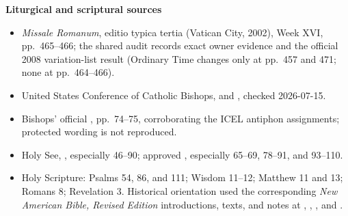 \textbf{Liturgical and scriptural sources}
{\footnotesize
\begin{itemize}[itemsep=0em,topsep=0.15em,parsep=0pt]
\item \emph{Missale Romanum}, editio typica tertia (Vatican City, 2002), Week XVI, pp.~465--466; the shared audit records exact owner evidence and the official 2008 variation-list result (Ordinary Time changes only at pp.~457 and 471; none at pp.~464--466).
\item United States Conference of Catholic Bishops,  and , checked 2026-07-15.
\item Bishops' official , pp.~74--75, corroborating the ICEL antiphon assignments; protected wording is not reproduced.
\item Holy See, , especially 46--90; approved , especially 65--69, 78--91, and 93--110.
\item Holy Scripture: Psalms 54, 86, and 111; Wisdom 11--12; Matthew 11 and 13; Romans 8; Revelation 3. Historical orientation used the corresponding \emph{New American Bible, Revised Edition} introductions, texts, and notes at , , , and .
\end{itemize}}

